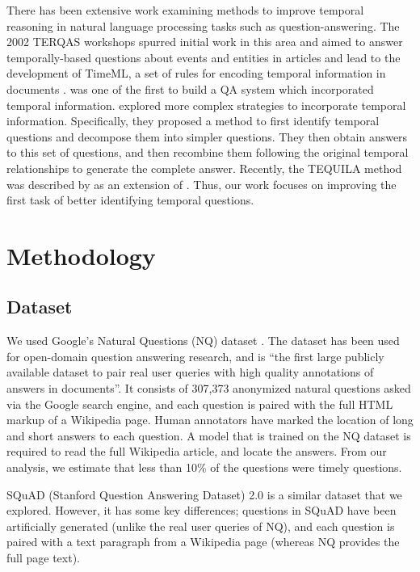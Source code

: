\documentclass{article}
\begin{document}
There has been extensive work examining methods to improve temporal reasoning in
natural language processing tasks such as question-answering. The 2002 TERQAS
workshops spurred initial work in this area and aimed to answer temporally-based
questions about events and entities in articles and lead to the development of
TimeML, a set of rules for encoding temporal information in documents
\cite{radev2002using}. \cite{breck2000another} was one of the first to build a
QA system which incorporated temporal information. \cite{saquete2009enhancing}
explored more complex strategies to incorporate temporal information.
Specifically, they proposed a method to first identify temporal questions and
decompose them into simpler questions. They then obtain answers to this set of
questions, and then recombine them following the original temporal relationships
to generate the complete answer. Recently, the TEQUILA method was described by
\cite{jia2018tequila} as an extension of \cite{saquete2009enhancing}. Thus, our
work focuses on improving the first task of better identifying temporal
questions.

\section{Methodology}
\label{methodology}


\subsection{Dataset}
\label{dataset}
We used Google’s Natural Questions (NQ) dataset \cite{nqdataset}. The dataset
has been used for open-domain question answering research, and is “the first
large publicly available dataset to pair real user queries with high quality
annotations of answers in documents”. It consists of 307,373 anonymized natural
questions asked via the Google search engine, and each question is paired with
the full HTML markup of a Wikipedia page. Human annotators have marked the
location of long and short answers to each question. A model that is trained on
the NQ dataset is required to read the full Wikipedia article, and locate the
answers. From our analysis, we estimate that less than 10\% of the questions
were timely questions.

SQuAD (Stanford Question Answering Dataset) 2.0 \cite{squaddataset} is a similar
dataset that we explored. However, it has some key differences; questions in
SQuAD have been artificially generated (unlike the real user queries of NQ), and
each question is paired with a text paragraph from a Wikipedia page (whereas NQ
provides the full page text).
\end{document}
